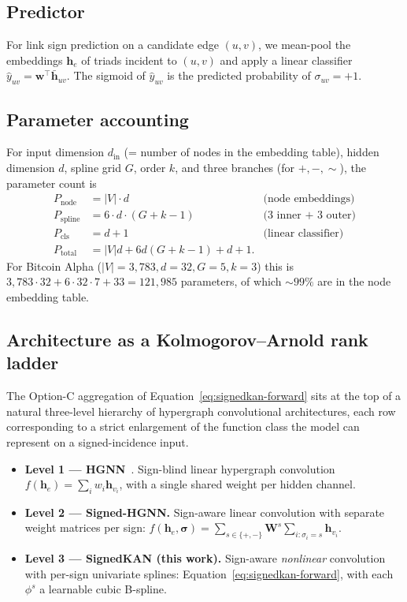 \subsection{Predictor}

For link sign prediction on a candidate edge $(u, v)$, we mean-pool
the embeddings $\mathbf{h}_e$ of triads incident to $(u, v)$ and apply
a linear classifier $\hat{y}_{uv} = \mathbf{w}^\top \bar{\mathbf{h}}_{uv}$.
The sigmoid of $\hat{y}_{uv}$ is the predicted probability of
$\sigma_{uv} = +1$.

\subsection{Parameter accounting}

For input dimension $d_{\text{in}}$ (= number of nodes in the
embedding table), hidden dimension $d$, spline grid $G$, order $k$,
and three branches (for $+, -, \sim$), the parameter count is
\begin{align}
P_{\text{node}} &= |V| \cdot d & \text{(node embeddings)} \\
P_{\text{spline}} &= 6 \cdot d \cdot (G + k - 1) & \text{(3 inner + 3 outer)} \\
P_{\text{cls}} &= d + 1 & \text{(linear classifier)} \\
P_{\text{total}} &= |V|d + 6 d(G + k - 1) + d + 1.
\end{align}
For Bitcoin Alpha ($|V| = 3{,}783, d = 32, G = 5, k = 3$) this is
$3{,}783 \cdot 32 + 6 \cdot 32 \cdot 7 + 33 = 121{,}985$ parameters,
of which $\sim 99\%$ are in the node embedding table.

\subsection{Architecture as a Kolmogorov--Arnold rank ladder}
\label{sec:ka-rank}

The Option-C aggregation of
Equation~\eqref{eq:signedkan-forward} sits at the top of a natural
three-level hierarchy of hypergraph convolutional architectures,
each row corresponding to a strict enlargement of the function
class the model can represent on a signed-incidence input.

\begin{itemize}
\item \textbf{Level 1 --- HGNN}~\cite{feng2019hgnn}. Sign-blind
  linear hypergraph convolution
  $f(\mathbf{h}_e) = \sum_{i} w_i \mathbf{h}_{v_i}$, with a single
  shared weight per hidden channel.
\item \textbf{Level 2 --- Signed-HGNN.} Sign-aware linear
  convolution with separate weight matrices per sign:
  $f(\mathbf{h}_e, \boldsymbol{\sigma}) = \sum_{s \in \{+,-\}}
   \mathbf{W}^{s}\!\sum_{i : \sigma_i = s}\!\mathbf{h}_{v_i}$.
\item \textbf{Level 3 --- SignedKAN (this work).} Sign-aware
  \emph{nonlinear} convolution with per-sign univariate splines:
  Equation~\eqref{eq:signedkan-forward}, with each
  $\phi^{s}$ a learnable cubic B-spline.
\end{itemize}

